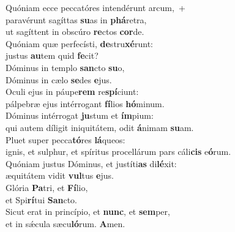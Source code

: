 \evenverse Quóniam ecce peccatóres intendérunt arcum,~+\\\evenverse  paravérunt sagíttas \textbf{su}as in \textbf{phá}retra,~\*\\
\evenverse ut sagíttent in obscúro \textbf{re}ctos \textbf{cor}de.\\
\oddverse Quóniam quæ perfecísti, \textbf{de}stru\textbf{xé}runt:~\*\\
\oddverse justus \textbf{au}tem quid \textbf{fe}cit?\\
\evenverse Dóminus in templo \textbf{san}cto \textbf{su}o,~\*\\
\evenverse Dóminus in cælo \textbf{se}des \textbf{e}jus.\\
\oddverse Oculi ejus in páupe\textbf{rem} re\textbf{spí}ciunt:~\*\\
\oddverse pálpebræ ejus intérrogant \textbf{fí}lios \textbf{hó}minum.\\
\evenverse Dóminus intérrogat \textbf{ju}stum et \textbf{ím}pium:~\*\\
\evenverse qui autem díligit iniquitátem, odit \textbf{á}nimam \textbf{su}am.\\
\oddverse Pluet super pecca\textbf{tó}res \textbf{lá}queos:~\*\\
\oddverse ignis, et sulphur, et spíritus procellárum pars cáli\textbf{cis} e\textbf{ó}rum.\\
\evenverse Quóniam justus Dóminus, et justíti\textbf{as} di\textbf{lé}xit:~\*\\
\evenverse æquitátem vidit \textbf{vul}tus \textbf{e}jus.\\
\oddverse Glória \textbf{Pa}tri, et \textbf{Fí}lio,~\*\\
\oddverse et Spi\textbf{rí}tui \textbf{San}cto.\\
\evenverse Sicut erat in princípio, et \textbf{nunc}, et \textbf{sem}per,~\*\\
\evenverse et in sǽcula sæcu\textbf{ló}rum. \textbf{A}men.\\
